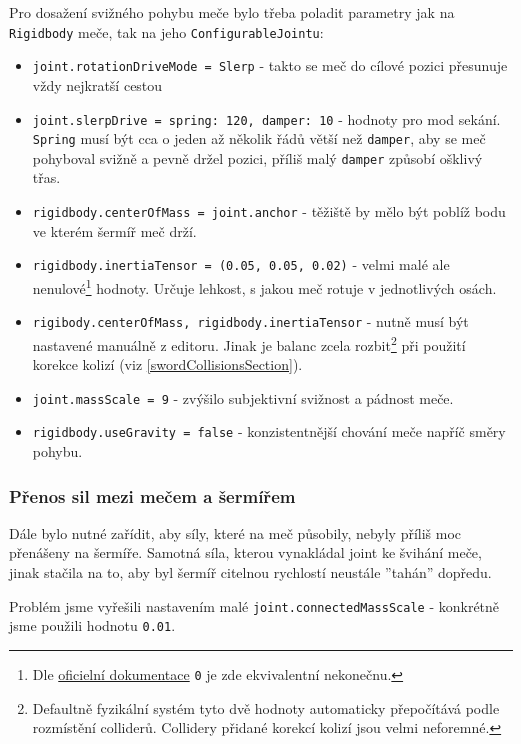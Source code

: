 Pro dosažení svižného pohybu meče bylo třeba poladit parametry jak na \texttt{Rigidbody} meče, tak na jeho \texttt{ConfigurableJointu}:
\begin{itemize}
  \item \texttt{joint.rotationDriveMode = Slerp} - takto se meč do cílové pozici přesunuje vždy nejkratší cestou
  \item \texttt{joint.slerpDrive = {spring: 120, damper: 10}} - hodnoty pro mod sekání. \texttt{Spring} musí být cca o jeden až několik řádů větší než \texttt{damper}, aby se meč pohyboval svižně a pevně držel pozici, příliš malý \texttt{damper} způsobí ošklivý třas.
  \item \texttt{rigidbody.centerOfMass = joint.anchor} - těžiště by mělo být poblíž bodu ve kterém šermíř meč drží.
  \item \texttt{rigidbody.inertiaTensor = (0.05, 0.05, 0.02)} - velmi malé ale nenulové\footnote{Dle \href{https://docs.unity3d.com/ScriptReference/Rigidbody-inertiaTensor.html}{oficielní dokumentace} \texttt{0} je zde ekvivalentní nekonečnu.} hodnoty. Určuje lehkost, s jakou meč rotuje v jednotlivých osách.
  \item \texttt{rigibody.centerOfMass, rigidbody.inertiaTensor} - nutně musí být nastavené manuálně z editoru. Jinak je balanc zcela rozbit\footnote{Defaultně fyzikální systém tyto dvě hodnoty automaticky přepočítává podle rozmístění colliderů. Collidery přidané korekcí kolizí jsou velmi neforemné.} při použití korekce kolizí (viz \ref{swordCollisionsSection}).
  \item \texttt{joint.massScale = 9} - zvýšilo subjektivní svižnost a pádnost meče.
  \item \texttt{rigidbody.useGravity = false} - konzistentnější chování meče napříč směry pohybu.
\end{itemize}

\subsubsection*{Přenos sil mezi mečem a šermířem}

Dále bylo nutné zařídit, aby síly, které na meč působily, nebyly příliš moc přenášeny na šermíře. Samotná síla, kterou vynakládal joint ke švihání meče, jinak stačila na to, aby byl šermíř citelnou rychlostí neustále ''tahán'' dopředu.

Problém jsme vyřešili nastavením malé \texttt{joint.connectedMassScale} - konkrétně jsme použili hodnotu \texttt{0.01}.

